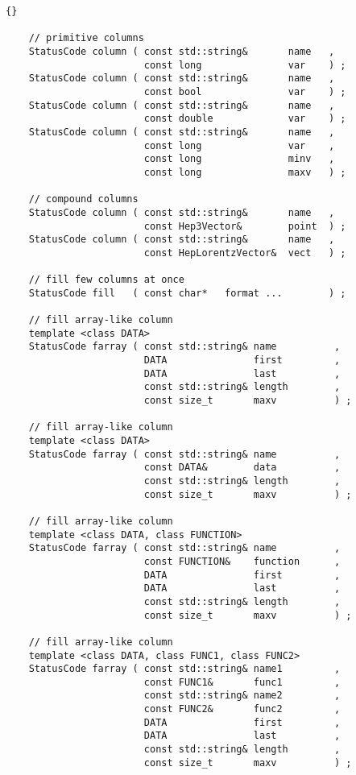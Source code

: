 \documentclass{lhcbnote}
\begin{document}
\begin{scriptsize}
  \begin{lstlisting}{}

    // primitive columns 
    StatusCode column ( const std::string&       name   , 
                        const long               var    ) ;
    StatusCode column ( const std::string&       name   , 
                        const bool               var    ) ;
    StatusCode column ( const std::string&       name   , 
                        const double             var    ) ;
    StatusCode column ( const std::string&       name   , 
                        const long               var    , 
                        const long               minv   , 
                        const long               maxv   ) ;
 
    // compound columns 
    StatusCode column ( const std::string&       name   , 
                        const Hep3Vector&        point  ) ;
    StatusCode column ( const std::string&       name   , 
                        const HepLorentzVector&  vect   ) ;

    // fill few columns at once
    StatusCode fill   ( const char*   format ...        ) ;

    // fill array-like column
    template <class DATA> 
    StatusCode farray ( const std::string& name          , 
                        DATA               first         , 
                        DATA               last          ,
                        const std::string& length        , 
                        const size_t       maxv          ) ;

    // fill array-like column
    template <class DATA> 
    StatusCode farray ( const std::string& name          , 
                        const DATA&        data          , 
                        const std::string& length        , 
                        const size_t       maxv          ) ;
  
    // fill array-like column
    template <class DATA, class FUNCTION> 
    StatusCode farray ( const std::string& name          ,
                        const FUNCTION&    function      ,
                        DATA               first         , 
                        DATA               last          ,
                        const std::string& length        , 
                        const size_t       maxv          ) ; 

    // fill array-like column
    template <class DATA, class FUNC1, class FUNC2> 
    StatusCode farray ( const std::string& name1         ,
                        const FUNC1&       func1         ,
                        const std::string& name2         ,
                        const FUNC2&       func2         ,
                        DATA               first         , 
                        DATA               last          ,
                        const std::string& length        , 
                        const size_t       maxv          ) ; 
  
 \end{lstlisting}
\end{scriptsize}
\end{document}
